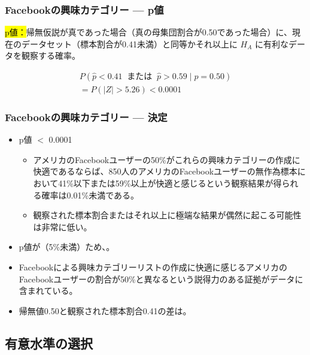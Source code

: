 
\begin{frame}
\frametitle{Facebookの興味カテゴリー — p値}

\hl{p値：}帰無仮説が真であった場合（真の母集団割合が0.50であった場合）に、現在のデータセット（標本割合が0.41未満）と同等かそれ以上に $H_A$ に有利なデータを観察する確率。

\begin{align*}
P(\hat{p} < 0.41~\text{ または }~\hat{p} > 0.59 \mid p = 0.50) \\
= P(|Z| > 5.26) < 0.0001
\end{align*}

\end{frame}


\begin{frame}
\frametitle{Facebookの興味カテゴリー — 決定}

\begin{itemize}

\item p値 $<$ 0.0001

\begin{itemize}
\item アメリカのFacebookユーザーの50\%がこれらの興味カテゴリーの作成に快適であるならば、850人のアメリカのFacebookユーザーの無作為標本において41\%以下または59\%以上が快適と感じるという観察結果が得られる確率は0.01\%未満である。
\item 観察された標本割合またはそれ以上に極端な結果が偶然に起こる可能性は非常に低い。
\end{itemize}

\item p値が（5\%未満）ため、。

\item Facebookによる興味カテゴリーリストの作成に快適に感じるアメリカのFacebookユーザーの割合が50\%と異なるという説得力のある証拠がデータに含まれている。

\item 帰無値0.50と観察された標本割合0.41の差は。

\end{itemize}

\end{frame}


\subsection{有意水準の選択}


